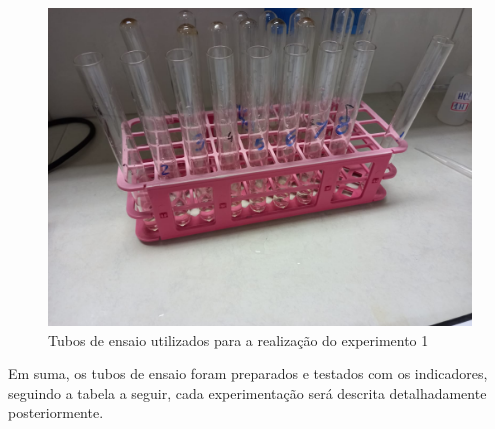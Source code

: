         \begin{figure}[h]
            \centering
            \includegraphics[scale=0.25]{pictures/tubos.jpeg}
            \caption{Tubos de ensaio utilizados para a realização do experimento 1}\label{fig:figure2}
        \end{figure}

        \indent Em suma, os tubos de ensaio foram preparados e testados com os indicadores, seguindo a tabela a seguir, cada experimentação será descrita detalhadamente posteriormente.\\

        \newpage

